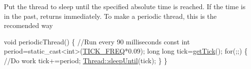 Put the thread to sleep until the specified absolute time is reached. If the time is in the past, returns immediately. To make a periodic thread, this is the recomended way 
\begin{DoxyCode}
\textcolor{keywordtype}{void} periodicThread()
\{
    \textcolor{comment}{//Run every 90 milliseconds}
    \textcolor{keyword}{const} \textcolor{keywordtype}{int} period=\textcolor{keyword}{static\_cast<}\textcolor{keywordtype}{int}\textcolor{keyword}{>}(\hyperlink{group___settings_ga81e4cfce99dd185b6ada00ead4f39342}{TICK\_FREQ}*0.09);
    \textcolor{keywordtype}{long} \textcolor{keywordtype}{long} tick=\hyperlink{group___kernel_gad16c495ced6659e8bc0bb371362674ef}{getTick}();
    \textcolor{keywordflow}{for}(;;)
    \{
        \textcolor{comment}{//Do work}
        tick+=period;
        \hyperlink{classmiosix_1_1_thread_aac116a322826366c7b3269db3ab4be73}{Thread::sleepUntil}(tick);
    \}
\}
\end{DoxyCode}
 
